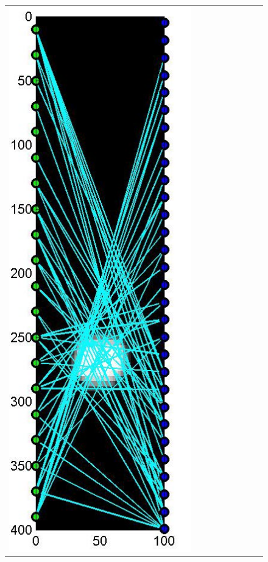 \documentclass[11pt]{article}
\begin{document}
\begin{figure}[!h]
\begin{center}
\begin{tabular}{|c|c|c|c|c|c|c|c|c|}
			\includegraphics[width=.9\iwidth]{figures/newFigs/noisy/resultsExp-6-designs}
			&

\end{tabular}
\end{center}
\end{figure}
\end{document}
